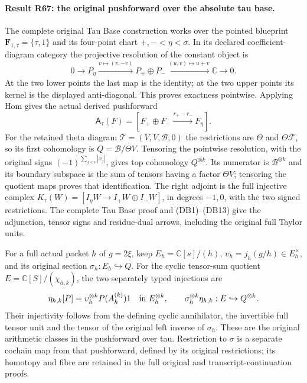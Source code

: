\paragraph{Result R67: the original pushforward over the absolute tau base.}
The complete original Tau Base construction works over the pointed blueprint
$\mathbf F_{1,\tau}=\{\tau,1\}$ and its four-point chart
$+,-<\eta<\sigma$. In its declared coefficient-diagram category the
projective resolution of the constant object is
\[
0\longrightarrow P_\eta\xrightarrow{v\mapsto(v,-v)}
P_+\oplus P_-\xrightarrow{(u,v)\mapsto u+v}\mathbb C\longrightarrow0.
\]
At the two lower points the last map is the identity; at the two
upper points its kernel is the displayed anti-diagonal. This proves
exactness pointwise. Applying Hom gives the actual derived pushforward
\[
\mathsf A_\tau(F)=[F_+\oplus F_-\xrightarrow{r_+-r_-}F_\eta].
\]
For the retained theta diagram
$\mathcal T=(V,V,\mathscr B,0)$ the restrictions are
$\Theta$ and $\Theta\mathcal F$, so its first cohomology is
$Q=\mathscr B/\Theta V$. Tensoring the pointwise resolution, with
the original signs $(-1)^{\sum_{j<i}|x_j|}$, gives top cohomology
$Q^{\otimes k}$. Its numerator is $\mathscr B^{\otimes k}$ and
its boundary subspace is the sum of tensors having a factor
$\Theta V$; tensoring the quotient maps proves that identification.
The right adjoint is the full injective complex
$K_\tau(W)=[I_\eta W\to I_+W\oplus I_-W]$, in degrees $-1,0$,
with the two signed restrictions. The complete Tau Base proof and
(DB1)--(DB13) give the adjunction, tensor signs and residue-dual
arrows, including the original full Taylor units.

For a full actual packet $h$ of $g=2\xi$, keep
$E_h=\mathbb C[s]/(h)$, $\upsilon_h=j_h(g/h)\in E_h^\times$,
and its original section $\sigma_h:E_h\hookrightarrow Q$.
For the cyclic tensor-sum quotient $E=\mathbb C[S]/(\chi_{h,k})$,
the two separately typed injections are
\[
\eta_{h,k}[P]=\upsilon_h^{\otimes k}P(A_h^{(k)})1
\quad\hbox{in }E_h^{\otimes k},\qquad
\sigma_h^{\otimes k}\eta_{h,k}:E\hookrightarrow Q^{\otimes k}.
\]
Their injectivity follows from the defining cyclic annihilator,
the invertible full tensor unit and the tensor of the original
left inverse of $\sigma_h$. These are the original arithmetic
classes in the pushforward over tau. Restriction to $\sigma$
is a separate cochain map from that pushforward, defined by its
original restrictions; its homotopy and fibre are retained in
the full original and transcript-continuation proofs.

